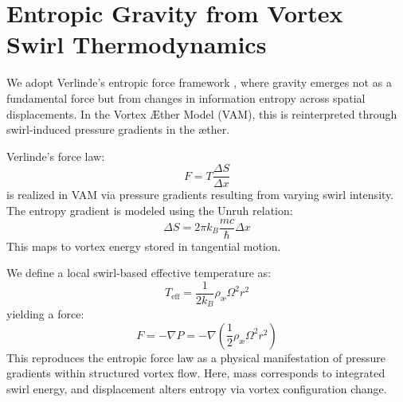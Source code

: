 \documentclass[12pt]{article}
\begin{document}
    \titlepageOpen

    \begin{abstract}
        This appendix formalizes the dynamic coupling between translational and rotational motion of vortex knots in the æther, expressed through distinct VAM time modes. Rotational evolution is tracked via Vortex Proper Time \( T_v \), while axial displacement is governed by Chronos-Time \( \tau \) and projected globally through Aithēr-Time \( \mathcal{N} \). We derive a causal relation linking relative vorticity to translational velocity, revealing how kinetic energy redistributes along vortex tubes. This temporal decomposition clarifies the interdependence between angular and linear dynamics in structured æther flows.
    \end{abstract}


    \titlepageClose
    \fi

    \section{Entropic Gravity from Vortex Swirl Thermodynamics}

    We adopt Verlinde’s entropic force framework \cite{verlinde2010emergent}, where gravity emerges not as a fundamental force but from changes in information entropy across spatial displacements. In the Vortex Æther Model (VAM), this is reinterpreted through swirl-induced pressure gradients in the æther.

    Verlinde's force law:
    \[
        F = T \frac{\Delta S}{\Delta x}
    \]
    is realized in VAM via pressure gradients resulting from varying swirl intensity. The entropy gradient is modeled using the Unruh relation:
    \[
        \Delta S = 2\pi k_B \frac{mc}{\hbar} \Delta x
    \]
    This maps to vortex energy stored in tangential motion.

    We define a local swirl-based effective temperature as:
    \[
        T_\text{eff} = \frac{1}{2k_B} \rho_{\text{\ae}} \Omega^2 r^2
    \]
    yielding a force:
    \[
        F = -\nabla P = -\nabla \left( \frac{1}{2} \rho_{\text{\ae}} \Omega^2 r^2 \right)
    \]
    This reproduces the entropic force law as a physical manifestation of pressure gradients within structured vortex flow. Here, mass corresponds to integrated swirl energy, and displacement alters entropy via vortex configuration change.
\end{document}
